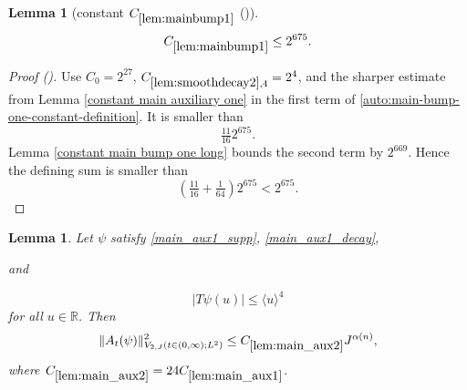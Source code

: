 \documentclass[12pt,reqno]{amsart}
\newcommand{\auto}{{({\tiny\faCar})}}
\theoremstyle{plain}
\newtheorem{lemma}[theorem]{Lemma}
\numberwithin{equation}{section}
\theoremstyle{remark}
\newcommand{\using}[1]{}
\newcommand{\R}{{\mathbb R}}
\begin{document}
\begin{lemma}[constant $C_{\ref{lem:mainbump1}}$ \auto]\label{constant main bump one}\using{lem:smoothdecay2}\using{constant main auxiliary one}\using{lem:mainbump1}\using{constant main bump one long}
\begin{equation}\label{constant main bump one bound}
C_{\ref{lem:mainbump1}}\le2^{675}.
\end{equation}
\end{lemma}
\begin{proof}[Proof \auto]
Use $C_0=2^{27}$, $C_{\ref{lem:smoothdecay2},4}=2^4$, and the sharper estimate from Lemma \ref{constant main auxiliary one} in the first term of \eqref{auto:main-bump-one-constant-definition}. It is smaller than
\[
\tfrac{11}{16}2^{675}.
\]
Lemma \ref{constant main bump one long} bounds the second term by $2^{669}$. Hence the defining sum is smaller than
\[
\left(\tfrac{11}{16}+\tfrac1{64}\right)2^{675}<2^{675}.
\]
\end{proof}


\begin{lemma}\label{lem:main_aux2}\using{lem:shortlongftc_reduction}\using{lem:main_aux1}\using{lem:bootstrap}
Let $\psi$ satisfy \eqref{main_aux1_supp}, \eqref{main_aux1_decay},


and


\begin{equation}
\label{main_aux2_decay}
|T\psi(u)|\le\langle u\rangle^4
\end{equation}
for all $u\in \R$.
Then
\begin{equation}\label{main_aux2}
\|A_{t}(\psi)\|_{V_{2,J}(t\in(0,\infty);L^2)}^2 \le C_{\ref{lem:main_aux2}} J^{\alpha(n)},
\end{equation}
where $C_{\ref{lem:main_aux2}} = 24 C_{\ref{lem:main_aux1}}$.
\end{lemma}
\end{document}
